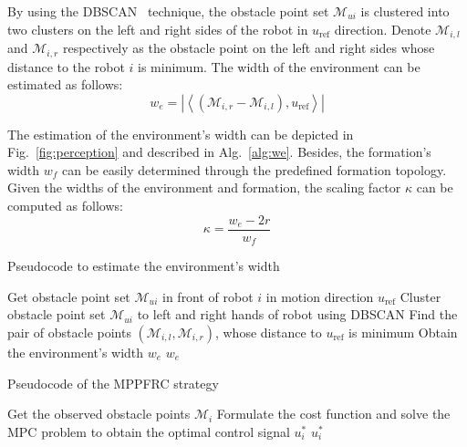 By using the DBSCAN~\cite{10.5555/3001460.3001507} technique, the obstacle point set $\mathcal{M}_{ui}$ is clustered into two clusters on the left and right sides of the robot in $u_\text{ref}$ direction. Denote $\mathcal{M}_{i,l}$ and $\mathcal{M}_{i,r}$ respectively as the obstacle point on the left and right sides whose distance to the robot $i$ is minimum. The width of the environment can be estimated as follows:
\begin{equation}
    w_e= \left\vert\left\langle\left(\mathcal{M}_{i,r}-\mathcal{M}_{i,l}\right),u_\text{ref}\right\rangle\right\vert
    \label{eqn:we}
\end{equation}

The estimation of the environment's width can be depicted in Fig.~\ref{fig:perception} and described in Alg.~\ref{alg:we}. Besides, the formation's width $w_f$ can be easily determined through the predefined formation topology. Given the widths of the environment and formation, the scaling factor $\kappa$ can be computed as follows:
\begin{equation}
    \kappa=\dfrac{w_e-2r}{w_f}
    \label{eqn:kappa}
\end{equation}


\begin{algorithm}
\caption{Pseudocode to estimate the environment's width}
\label{alg:we}
Get obstacle point set $\mathcal{M}_{ui}$ in front of robot $i$ in motion direction $u_\text{ref}$
Cluster obstacle point set $\mathcal{M}_{ui}$ to left and right hands of robot using DBSCAN\;
Find the pair of obstacle points $\left(\mathcal{M}_{i,l},\mathcal{M}_{i,r}\right)$, whose distance to $u_\text{ref}$ is minimum\;
Obtain the environment's width $w_e$
\Return $w_e$\;
\end{algorithm}

\begin{algorithm}[h!]
\caption{Pseudocode of the MPPFRC strategy}
\label{alg:our}
Get the observed obstacle points $\mathcal{M}_i$\;
Formulate the cost function and solve the MPC problem to obtain the optimal control signal $u_i^*$
\Return $u_i^*$\;
\end{algorithm}

